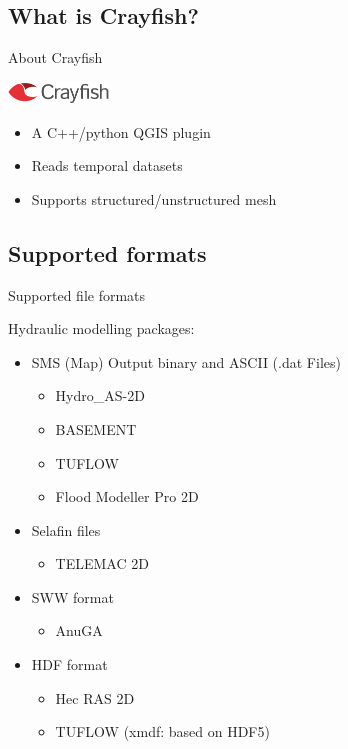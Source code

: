 \subsection{What is Crayfish?}
\begin{frame}{About Crayfish}
	\begin{block}{ {\includegraphics[width=0.2\textwidth]{crayfishlogo.png}}	}
		\begin{itemize}
			\item A C++/python QGIS plugin
			\item Reads temporal datasets
			\item Supports structured/unstructured mesh
		\end{itemize}
	\end{block}

\end{frame}

\subsection{Supported formats}
\begin{frame}{Supported file formats}
	\begin{block}{Hydraulic modelling packages:}
		\begin{itemize}
			\item SMS (Map) Output binary and ASCII (.dat Files)
				\begin{itemize}
					\item Hydro\_AS-2D
					\item BASEMENT
					\item TUFLOW
					\item Flood Modeller Pro 2D
				\end{itemize}
			\item Selafin files
					\begin{itemize}
						\item TELEMAC 2D
					\end{itemize}
			\item SWW format
					\begin{itemize}
						\item AnuGA
					\end{itemize}
			\item HDF format
					\begin{itemize}
						\item Hec RAS 2D
						\item TUFLOW (xmdf: based on HDF5)
					\end{itemize}
		\end{itemize}
	
	\end{block}
	
\end{frame}

